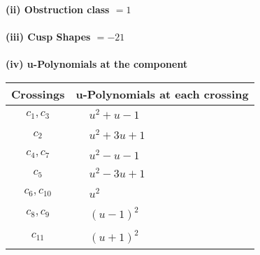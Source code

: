 \documentclass[1p]{elsarticle_modified}
\theoremstyle{definition}
\begin{document}
\flushleft \textbf{(ii) Obstruction class $= 1$}\\~\\
\flushleft \textbf{(iii) Cusp Shapes $= -21$}\\~\\
\newpage\renewcommand{\arraystretch}{1}
\flushleft \textbf{(iv) u-Polynomials at the component}\newline \\
\begin{tabular}{m{50pt}|m{274pt}}
Crossings & \hspace{64pt}u-Polynomials at each crossing \\
\hline $$\begin{aligned}c_{1},c_{3}\end{aligned}$$&$\begin{aligned}
&u^2+u-1
\end{aligned}$\\
\hline $$\begin{aligned}c_{2}\end{aligned}$$&$\begin{aligned}
&u^2+3 u+1
\end{aligned}$\\
\hline $$\begin{aligned}c_{4},c_{7}\end{aligned}$$&$\begin{aligned}
&u^2- u-1
\end{aligned}$\\
\hline $$\begin{aligned}c_{5}\end{aligned}$$&$\begin{aligned}
&u^2-3 u+1
\end{aligned}$\\
\hline $$\begin{aligned}c_{6},c_{10}\end{aligned}$$&$\begin{aligned}
&u^2
\end{aligned}$\\
\hline $$\begin{aligned}c_{8},c_{9}\end{aligned}$$&$\begin{aligned}
&(u-1)^2
\end{aligned}$\\
\hline $$\begin{aligned}c_{11}\end{aligned}$$&$\begin{aligned}
&(u+1)^2
\end{aligned}$\\
\hline
\end{tabular}\\~\\
\end{document}
